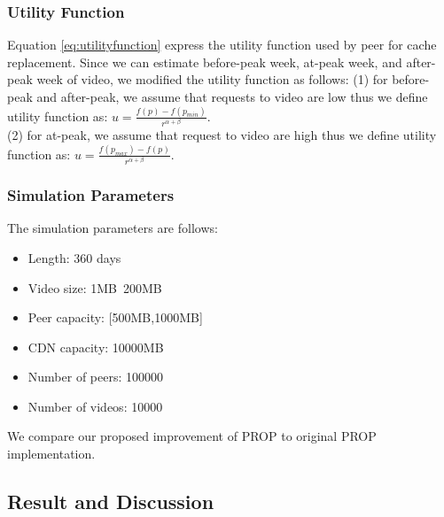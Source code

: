 \documentclass[conference]{IEEEtran}
\begin{document}
\subsubsection{Utility Function}
Equation \ref{eq:utilityfunction} express the utility function used by peer for cache replacement. 
Since we can estimate before-peak week, at-peak week, and after-peak week of video, we modified the utility function as follows: (1) for before-peak and after-peak, we assume that requests to video are low thus we define utility function as:  $u = \frac{f(p)-f(p_{min})} {r^{\alpha+\beta}}$.\\
(2) for at-peak, we assume that request to video are high thus we define utility function as:
$u = \frac{f(p_{max})-f(p)}{r^{\alpha+\beta}}$.

\subsubsection{Simulation Parameters}
The simulation parameters are follows:
\begin{itemize}
\item Length: 360 days
\item Video size: 1MB~200MB
\item Peer capacity: [500MB,1000MB]
\item CDN capacity: 10000MB
\item Number of peers: 100000
\item Number of videos: 10000
\end{itemize}
We compare our proposed improvement of PROP to original PROP \cite{1613869} implementation.

\subsection{Result and Discussion}\label{resultanddiscussion}
\end{document}
